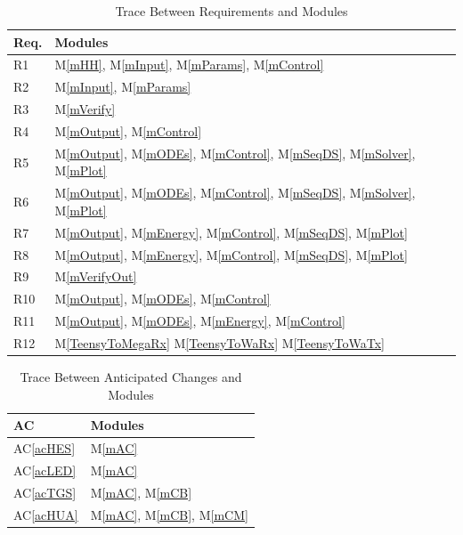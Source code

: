 \documentclass[12pt, titlepage]{article}
\newcommand{\acref}[1]{AC\ref{#1}}
\newcommand{\mref}[1]{M\ref{#1}}
\begin{document}
\begin{table}[H]
\centering
\begin{tabular}{p{} p{}}
\toprule
\textbf{Req.} & \textbf{Modules}\\
\midrule
R1 & \mref{mHH}, \mref{mInput}, \mref{mParams}, \mref{mControl}\\
R2 & \mref{mInput}, \mref{mParams}\\
R3 & \mref{mVerify}\\
R4 & \mref{mOutput}, \mref{mControl}\\
R5 & \mref{mOutput}, \mref{mODEs}, \mref{mControl}, \mref{mSeqDS}, \mref{mSolver}, \mref{mPlot}\\
R6 & \mref{mOutput}, \mref{mODEs}, \mref{mControl}, \mref{mSeqDS}, \mref{mSolver}, \mref{mPlot}\\
R7 & \mref{mOutput}, \mref{mEnergy}, \mref{mControl}, \mref{mSeqDS}, \mref{mPlot}\\
R8 & \mref{mOutput}, \mref{mEnergy}, \mref{mControl}, \mref{mSeqDS}, \mref{mPlot}\\
R9 & \mref{mVerifyOut}\\
R10 & \mref{mOutput}, \mref{mODEs}, \mref{mControl}\\
R11 & \mref{mOutput}, \mref{mODEs}, \mref{mEnergy}, \mref{mControl}\\
R12 & \mref{TeensyToMegaRx} \mref{TeensyToWaRx} \mref{TeensyToWaTx}\\

\bottomrule
\end{tabular}
\caption{Trace Between Requirements and Modules}
\label{TblRT}
\end{table}

\begin{table}[H]
\centering
\begin{tabular}{p{} p{}}
\toprule
\textbf{AC} & \textbf{Modules}\\
\midrule
\acref{acHES} & \mref{mAC}\\
\acref{acLED} & \mref{mAC}\\
\acref{acTGS} & \mref{mAC}, \mref{mCB}\\
\acref{acHUA} & \mref{mAC}, \mref{mCB}, \mref{mCM}\\
\bottomrule
\end{tabular}
\caption{Trace Between Anticipated Changes and Modules}
\label{TblACT}
\end{table}
\end{document}

